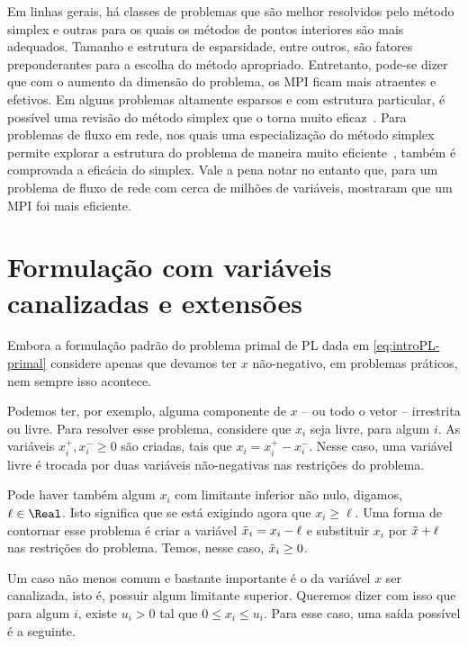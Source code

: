 Em linhas gerais, há classes de problemas que são melhor resolvidos
pelo método simplex e outras para os quais os métodos de pontos interiores são mais
adequados. Tamanho e estrutura de esparsidade, entre outros, são fatores
preponderantes para a escolha do  método apropriado. Entretanto, pode-se dizer
que com o aumento da dimensão do problema, os \ac{MPI} ficam mais atraentes e
efetivos. Em alguns problemas altamente esparsos e com  estrutura particular, é possível uma revisão
do método simplex que o torna muito eficaz~\cite{Hall:2005vw}. Para problemas
de fluxo em rede, nos quais uma especialização do método simplex permite
explorar a estrutura do problema de maneira muito
eficiente~\cite{Nemhauser:Integer-and-combinatorial:1988s}, também é comprovada a eficácia do simplex. Vale a pena notar no entanto que, para um problema de fluxo de rede com  cerca de milhões de variáveis, 
\textcite{Resende:1993hh} mostraram que um \ac{MPI} foi mais eficiente.



  




\section{Formulação com variáveis canalizadas e extensões}

Embora a formulação padrão do problema primal de \ac{PL} dada em \eqref{eq:introPL-primal} considere apenas que devamos ter $x$ não-negativo, em problemas práticos, nem sempre isso acontece. 

Podemos ter, por exemplo, alguma componente de $x$ -- ou todo o vetor -- irrestrita ou livre. Para resolver esse problema, considere que $x_{i}$ seja livre, para algum $i$. As variáveis $x_{i}^{+},x_{i}^{-}\geq 0$ são criadas, tais que $x_{i} = x_{i}^{+} -  x_{i}^{-}$. Nesse caso,  uma variável livre é trocada por duas variáveis não-negativas nas restrições do problema.

Pode haver também algum $x_{i}$ com limitante inferior não nulo, digamos, $\ell\in\Real$. Isto significa que se está exigindo agora que $ x_{i}\geq \ell$. Uma forma de  contornar esse problema é  criar a variável $\tilde{x}_{i} = x_{i} - \ell$ e substituir $x_{i}$ por $\tilde{x} +\ell $ nas restrições do problema. Temos, nesse caso,  $\tilde{x}_{i} \geq 0$.


Um caso não menos comum e bastante importante é o da variável $x$ ser canalizada, isto é, possuir algum limitante superior. Queremos dizer com isso que para algum $i$, existe  $u_i>0$ tal que $0\leq x_{i} \leq u_{i}$. Para esse caso, uma saída possível é a seguinte. 

